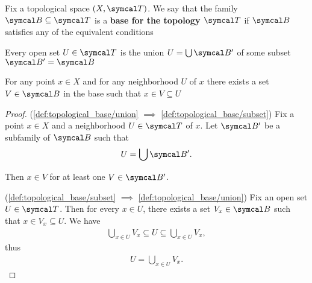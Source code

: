 \begin{definition}\label{def:topological_base}\cite[12]{Engelking1989}
  Fix a topological space \( (X, \Cal{T}) \). We say that the family \( \Cal{B} \subseteq \Cal{T} \) is a \textbf{base for the topology \( \Cal{T} \)} if \( \Cal{B} \) satisfies any of the equivalent conditions
  \begin{defenum}
    \item\label{def:topological_base/union} Every open set \( U \in \Cal{T} \) is the union \( U = \bigcup \Cal{B}' \) of some subset \( \Cal{B}' = \Cal{B} \)
    \item\label{def:topological_base/subset} For any point \( x \in X \) and for any neighborhood \( U \) of \( x \) there exists a set \( V \in \Cal{B} \) in the base such that \( x \in V \subseteq U \)
  \end{defenum}
\end{definition}
\begin{proof}
  (\ref{def:topological_base/union} \( \implies \) \ref{def:topological_base/subset}) Fix a point \( x \in X \) and a neighborhood \( U \in \Cal{T} \) of \( x \). Let \( \Cal{B}' \) be a subfamily of \( \Cal{B} \) such that
  \begin{align*}
    U = \bigcup \Cal{B}'.
  \end{align*}

  Then \( x \in V \) for at least one \( V \in \Cal{B}' \).

  (\ref{def:topological_base/subset} \( \implies \) \ref{def:topological_base/union}) Fix an open set \( U \in \Cal{T} \). Then for every \( x \in U \), there exists a set \( V_x \in \Cal{B} \) such that \( x \in V_x \subseteq U \). We have
  \begin{align*}
    \bigcup_{x \in U} V_x \subseteq U \subseteq \bigcup_{x \in U} V_x,
  \end{align*}
  thus
  \begin{align*}
    U = \bigcup_{x \in U} V_x.
  \end{align*}
\end{proof}

